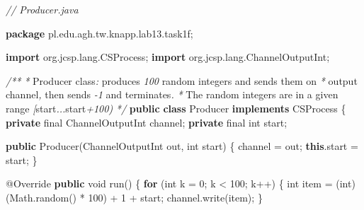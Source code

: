 \documentclass[11pt]{article}
\newenvironment{Shaded}{}{}
\newcommand{\KeywordTok}[1]{\textcolor[rgb]{0.00,0.44,0.13}{\textbf{{#1}}}}
\newcommand{\DataTypeTok}[1]{\textcolor[rgb]{0.56,0.13,0.00}{{#1}}}
\newcommand{\DecValTok}[1]{\textcolor[rgb]{0.25,0.63,0.44}{{#1}}}
\newcommand{\CommentTok}[1]{\textcolor[rgb]{0.38,0.63,0.69}{\textit{{#1}}}}
\newcommand{\FunctionTok}[1]{\textcolor[rgb]{0.02,0.16,0.49}{{#1}}}
\newcommand{\NormalTok}[1]{{#1}}
\newcommand{\ImportTok}[1]{{#1}}
\newcommand{\ControlFlowTok}[1]{\textcolor[rgb]{0.00,0.44,0.13}{\textbf{{#1}}}}
\newcommand{\OperatorTok}[1]{\textcolor[rgb]{0.40,0.40,0.40}{{#1}}}
\newcommand{\BuiltInTok}[1]{{#1}}
\newcommand{\AttributeTok}[1]{\textcolor[rgb]{0.49,0.56,0.16}{{#1}}}
\begin{document}
    \begin{Shaded}
\begin{Highlighting}[]
\CommentTok{// Producer.java}

\KeywordTok{package}\ImportTok{ pl}\OperatorTok{.}\ImportTok{edu}\OperatorTok{.}\ImportTok{agh}\OperatorTok{.}\ImportTok{tw}\OperatorTok{.}\ImportTok{knapp}\OperatorTok{.}\ImportTok{lab13}\OperatorTok{.}\ImportTok{task1f}\OperatorTok{;}

\KeywordTok{import} \ImportTok{org}\OperatorTok{.}\ImportTok{jcsp}\OperatorTok{.}\ImportTok{lang}\OperatorTok{.}\ImportTok{CSProcess}\OperatorTok{;}
\KeywordTok{import} \ImportTok{org}\OperatorTok{.}\ImportTok{jcsp}\OperatorTok{.}\ImportTok{lang}\OperatorTok{.}\ImportTok{ChannelOutputInt}\OperatorTok{;}

\CommentTok{/**}
 \CommentTok{*}\NormalTok{ Producer class}\CommentTok{:}\NormalTok{ produces }\CommentTok{100}\NormalTok{ random integers and sends them on}
 \CommentTok{*}\NormalTok{ output channel}\CommentTok{,}\NormalTok{ then sends }\CommentTok{{-}1}\NormalTok{ and terminates}\CommentTok{.}
 \CommentTok{*}\NormalTok{ The random integers are in a given range }\CommentTok{[}\NormalTok{start}\CommentTok{...}\NormalTok{start}\CommentTok{+100)}
 \CommentTok{*/}
\KeywordTok{public} \KeywordTok{class}\NormalTok{ Producer }\KeywordTok{implements}\NormalTok{ CSProcess }\OperatorTok{\{}
    \KeywordTok{private} \DataTypeTok{final}\NormalTok{ ChannelOutputInt channel}\OperatorTok{;}
    \KeywordTok{private} \DataTypeTok{final} \DataTypeTok{int}\NormalTok{ start}\OperatorTok{;}

    \KeywordTok{public} \FunctionTok{Producer}\OperatorTok{(}\NormalTok{ChannelOutputInt out}\OperatorTok{,} \DataTypeTok{int}\NormalTok{ start}\OperatorTok{)} \OperatorTok{\{}
\NormalTok{        channel }\OperatorTok{=}\NormalTok{ out}\OperatorTok{;}
        \KeywordTok{this}\OperatorTok{.}\FunctionTok{start} \OperatorTok{=}\NormalTok{ start}\OperatorTok{;}
    \OperatorTok{\}}

    \AttributeTok{@Override}
    \KeywordTok{public} \DataTypeTok{void} \FunctionTok{run}\OperatorTok{()} \OperatorTok{\{}
        \ControlFlowTok{for} \OperatorTok{(}\DataTypeTok{int}\NormalTok{ k }\OperatorTok{=} \DecValTok{0}\OperatorTok{;}\NormalTok{ k }\OperatorTok{\textless{}} \DecValTok{100}\OperatorTok{;}\NormalTok{ k}\OperatorTok{++)} \OperatorTok{\{}
            \DataTypeTok{int}\NormalTok{ item }\OperatorTok{=} \OperatorTok{(}\DataTypeTok{int}\OperatorTok{)} \OperatorTok{(}\BuiltInTok{Math}\OperatorTok{.}\FunctionTok{random}\OperatorTok{()} \OperatorTok{*} \DecValTok{100}\OperatorTok{)} \OperatorTok{+} \DecValTok{1} \OperatorTok{+}\NormalTok{ start}\OperatorTok{;}
\NormalTok{            channel}\OperatorTok{.}\FunctionTok{write}\OperatorTok{(}\NormalTok{item}\OperatorTok{);}
        \OperatorTok{\}}


\end{Highlighting}
\end{Shaded}
\end{document}
